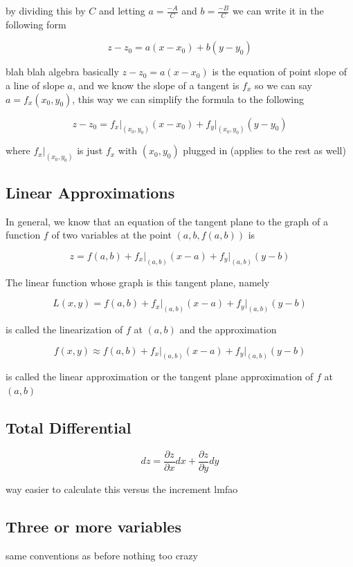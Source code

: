 \documentclass{article}
\begin{document}
by dividing this by $C$ and letting $a= \frac{-A}{C}$ and $b = \frac{-B}{C}$ we can write it in the following form

$$z - z_0 = a(x-x_0) + b(y - y_0)$$

blah blah algebra basically $z - z_0 = a(x-x_0)$ is the equation of point slope of a line of slope $a$, and we know the slope of a tangent is $f_x$ so we can say $a = f_x(x_0,y_0)$, this way we can simplify the formula to the following

$$z - z_0 = f_x \big\rvert_{(x_0,y_0)}(x-x_0) + f_y \big\rvert_{(x_0, y_0)}(y-y_0)$$

where $f_x \big\rvert_{(x_0,y_0)}$ is just $f_x$ with $(x_0, y_0)$ plugged in (applies to the rest as well)


\subsection{Linear Approximations}

In general, we know that an equation of the tangent plane to the graph of a function $f$ of two variables at the point $(a,b,f(a,b))$ is 

$$z = f(a,b) + f_x\big\rvert_{(a,b)}(x-a) + f_y\big\rvert_{(a,b)}(y-b)$$

The linear function whose graph is this tangent plane, namely

$$L(x,y) = f(a,b) + f_x\big\rvert_{(a,b)}(x-a) + f_y\big\rvert_{(a,b)}(y-b)$$

is called the linearization of $f$ at $(a,b)$ and the approximation

$$f(x,y) \approx f(a,b) + f_x\big\rvert_{(a,b)}(x-a) + f_y\big\rvert_{(a,b)}(y-b)$$

is called the linear approximation or the tangent plane approximation of $f$ at $(a,b)$


\subsection{Total Differential}

$$dz = \frac{\partial z}{\partial x}dx + \frac{\partial z}{\partial y}dy $$

way easier to calculate this versus the increment lmfao 


\subsection{Three or more variables}

same conventions as before nothing too crazy
\end{document}
